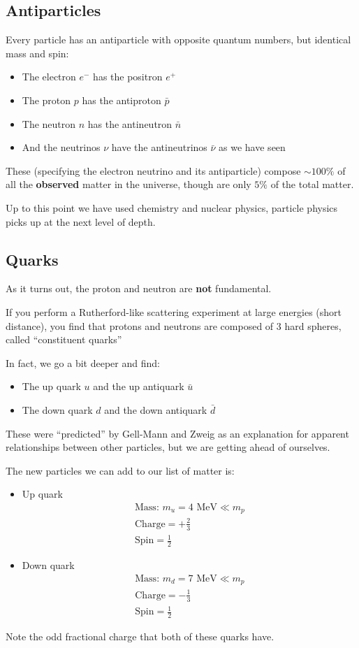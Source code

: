 \subsection{Antiparticles}
Every particle has an antiparticle with opposite quantum numbers, but identical mass and spin:
\begin{itemize}
\item The electron $e^-$ has the positron $e^+$
\item The proton $p$ has the antiproton $\bar{p}$
\item The neutron $n$ has the antineutron $\bar{n}$
\item And the neutrinos $\nu$ have the antineutrinos $\bar{\nu}$ as we have seen
\end{itemize}
These (specifying the electron neutrino and its antiparticle) compose $\sim100\%$ of all the \textbf{observed} matter in the universe, though are only $5\%$ of the total matter.

Up to this point we have used chemistry and nuclear physics, particle physics picks up at the next level of depth.

\subsection{Quarks}
As it turns out, the proton and neutron are \textbf{not} fundamental.

If you perform a Rutherford-like scattering experiment at large energies (short distance), you find that protons and neutrons are composed of 3 hard spheres, called ``constituent quarks''

In fact, we go a bit deeper and find:
\begin{itemize}
\item The up quark $u$ and the up antiquark $\bar{u}$
\item The down quark $d$ and the down antiquark $\bar{d}$
\end{itemize}

These were ``predicted'' by Gell-Mann and Zweig as an explanation for apparent relationships between other particles, but we are getting ahead of ourselves.

The new particles we can add to our list of matter is:

\begin{itemize}
\item Up quark
  \begin{gather*}
    \text{Mass: } m_u= 4\text{ MeV} \ll m_p\\
    \text{Charge}=+\frac23\\
    \text{Spin}=\frac12
  \end{gather*}
\item Down quark
  \begin{gather*}
    \text{Mass: } m_d= 7\text{ MeV} \ll m_p\\
    \text{Charge}=-\frac13\\
    \text{Spin}=\frac12
  \end{gather*}
\end{itemize}
Note the odd fractional charge that both of these quarks have.

